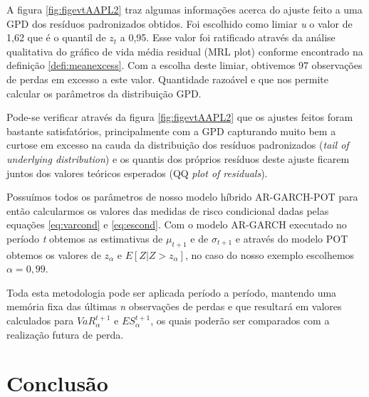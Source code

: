 \documentclass[review]{elsarticle}
\theoremstyle{definition}
\begin{document}
A figura \ref{fig:figevtAAPL2} traz algumas informações acerca do ajuste feito a uma GPD dos resíduos padronizados obtidos. Foi escolhido como limiar \emph{u} o valor de 1,62 que é o quantil de $z_t$ a 0,95. Esse valor foi ratificado através da análise qualitativa do gráfico de vida média residual (MRL plot) conforme encontrado na definição \ref{defi:meanexcess}. Com a escolha deste limiar, obtivemos 97 observações de perdas em excesso a este valor. Quantidade razoável e que nos permite calcular os parâmetros da distribuição GPD.

Pode-se verificar através da figura \ref{fig:figevtAAPL2} que os ajustes feitos foram bastante satisfatórios, principalmente com a GPD capturando muito bem a curtose em excesso na cauda da distribuição dos resíduos padronizados (\emph{tail of underlying distribution}) e os quantis dos próprios resíduos deste ajuste ficarem juntos dos valores teóricos esperados (QQ \emph{plot of residuals}).

Possuímos todos os parâmetros de nosso modelo híbrido AR-GARCH-POT para então calcularmos os valores das medidas de risco condicional dadas pelas equações \eqref{eq:varcond} e \eqref{eq:escond}. Com o modelo AR-GARCH executado no período \emph{t} obtemos as estimativas de $\mu_{t+1}$ e de $\sigma_{t+1}$ e através do modelo POT obtemos os valores de $z_\alpha$ e $E[Z|Z>z_\alpha]$, no caso do nosso exemplo escolhemos $\alpha=0,99$.

Toda esta metodologia pode ser aplicada período a período, mantendo uma memória fixa das últimas \emph{n} observações de perdas e que resultará em valores calculados para $VaR_\alpha^{t+1}$ e $ES_\alpha^{t+1}$, os quais poderão ser comparados com a realização futura de perda.

\section{Conclusão}
\end{document}
